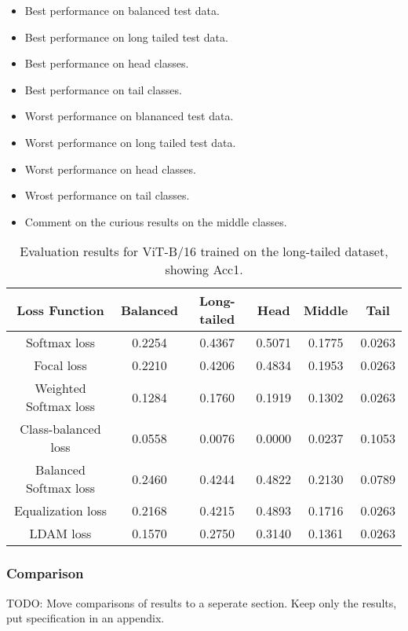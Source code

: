\begin{itemize}
    \item Best performance on balanced test data.
    \item Best performance on long tailed test data.
    \item Best performance on head classes.
    \item Best performance on tail classes.
    \item Worst performance on blananced test data.
    \item Worst performance on long tailed test data.
    \item Worst performance on head classes.
    \item Wrost performance on tail classes.
    \item Comment on the curious results on the middle classes.
\end{itemize}

\begin{table}[H]
    \centering
    \begin{tabular}{cccccc}
        \toprule
        Loss Function & Balanced & Long-tailed & Head & Middle & Tail \\ 
        \midrule
        Softmax loss   & 0.2254 & 0.4367 & 0.5071 & 0.1775 & 0.0263 \\
        Focal loss   & 0.2210 & 0.4206 & 0.4834 & 0.1953 & 0.0263 \\
        Weighted Softmax loss   & 0.1284 & 0.1760 & 0.1919 & 0.1302 & 0.0263 \\
        Class-balanced loss   & 0.0558 & 0.0076 & 0.0000 & 0.0237 & 0.1053 \\
        Balanced Softmax loss   & 0.2460 & 0.4244 & 0.4822 &  0.2130 & 0.0789 \\
        Equalization loss   & 0.2168 & 0.4215 & 0.4893 & 0.1716 & 0.0263 \\
        LDAM loss   & 0.1570 & 0.2750 & 0.3140 & 0.1361 & 0.0263 \\
        \bottomrule
    \end{tabular}
    \caption{Evaluation results for ViT-B/16 trained on the long-tailed dataset, showing Acc1.}
    \label{tab:vit_lt_acc1}
\end{table}

\subsubsection{Comparison}

TODO: Move comparisons of results to a seperate section. Keep only the results, put specification in an appendix.

